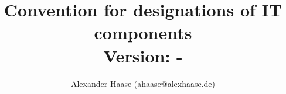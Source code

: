 \documentclass[a4paper,11pt]{article}
\title{
	Convention for designations of IT components \\
	\small Version: \gitVtag-\gitAbbrevHash
}
\author{Alexander Haase (\href{mailto:ahaase@alexhaase.de}{ahaase@alexhaase.de})}
\date{\gitAuthorDate}
\begin{document}
	\maketitle


	

	
	
	
	
	


	\nocite{*}
	{}
	
\end{document}
